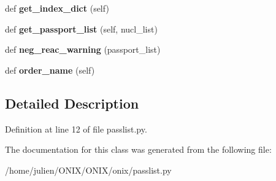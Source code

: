\begin{DoxyCompactItemize}
def {\bfseries get\+\_\+index\+\_\+dict} (self)
\item 
\mbox{\label{classonix_1_1passlist_1_1Passlist_a0ca33a3915798604c944f71482a5911c}} 
def {\bfseries get\+\_\+passport\+\_\+list} (self, nucl\+\_\+list)
\item 
\mbox{\label{classonix_1_1passlist_1_1Passlist_a26831d147e97f7b2d6f83f289939cbce}} 
def {\bfseries neg\+\_\+reac\+\_\+warning} (passport\+\_\+list)
\item 
\mbox{\label{classonix_1_1passlist_1_1Passlist_a3e4c091f7c436cbf60bd843c30ea6111}} 
def {\bfseries order\+\_\+name} (self)
\end{DoxyCompactItemize}


\subsection{Detailed Description}


Definition at line 12 of file passlist.\+py.



The documentation for this class was generated from the following file\+:\begin{DoxyCompactItemize}
\item 
/home/julien/\+O\+N\+I\+X/\+O\+N\+I\+X/onix/passlist.\+py\end{DoxyCompactItemize}
